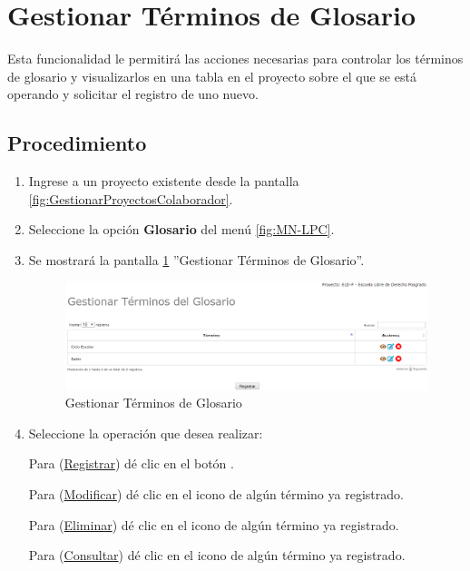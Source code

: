\hypertarget{cv:GestionarGlosario}{\section{Gestionar Términos de Glosario}} \label{sec:GestionarGlosario}

	Esta funcionalidad le permitirá las acciones necesarias para controlar los términos de glosario y visualizarlos en una tabla en el proyecto sobre el que se está operando y solicitar el registro de uno nuevo.

		\subsection{Procedimiento}

			\begin{enumerate}
				
			\item Ingrese a un proyecto existente desde la pantalla \ref{fig:GestionarProyectosColaborador}.
	
			\item Seleccione la opción \textbf{Glosario} del menú \ref{fig:MN-LPC}.
	
			\item Se mostrará la pantalla \ref{fig:GestionarGlosario} ''Gestionar Términos de Glosario''.

			\begin{figure}[h!]
				\begin{center}
					\includegraphics[scale=0.5]{roles/lider/glosario/pantallas/IU6gestionarGlosario}
					\caption{Gestionar Términos de Glosario}
					\label{fig:GestionarGlosario}
				\end{center}
			\end{figure}
		
				\item Seleccione la operación que desea realizar:
			
			Para (\hyperlink{cv:registrarTermino}{Registrar}) dé clic en el botón \IURegistrar.
			
			Para (\hyperlink{cv:modificarTermino}{Modificar}) dé clic en el icono \IUEditar{} de algún término ya registrado.
			
			Para (\hyperlink{cv:eliminarProyecto}{Eliminar}) dé clic en el icono \IUBotonEliminar{} de algún término ya registrado.
			
			Para (\hyperlink{cv:consultarTermino}{Consultar}) dé clic en el icono \IUConsultar{} de algún término ya registrado.
			\end{enumerate}